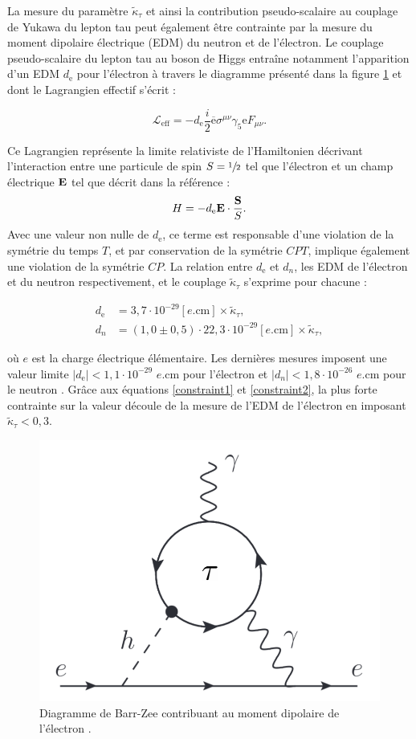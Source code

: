 La mesure du paramètre $\tilde{\kappa}_{\tau}$ et ainsi la contribution pseudo-scalaire au couplage de Yukawa du lepton tau peut également être contrainte par la mesure du moment dipolaire électrique (EDM) du neutron et de l'électron. Le couplage pseudo-scalaire du lepton tau au boson de Higgs entraîne notamment l'apparition d'un EDM $d_\mathrm{e}$ pour l'électron à travers le diagramme présenté dans la figure \ref{barrzee} et dont le Lagrangien effectif s'écrit :

\begin{equation}
    \mathcal{L}_{\text{eff}}=-d_\mathrm{e}\frac{i}{2}\overline{\mathrm{e}}\sigma^{\mu\nu}\gamma_5\mathrm{e}F_{\mu\nu}.
\end{equation}

Ce Lagrangien représente la limite relativiste de l'Hamiltonien décrivant l'interaction entre une particule de spin $S=\sfrac{1}{2}$ tel que l'électron et un champ électrique $\vb{E}$ tel que décrit dans la référence \cite{Pospelov_2005} : $$H=-d_\mathrm{e}\vb{E}\cdot\frac{\vb{S}}{S}.$$ Avec une valeur non nulle de $d_\mathrm{e}$, ce terme est responsable d'une violation de la symétrie du temps $T$, et par conservation de la symétrie $CPT$, implique également une violation de la symétrie $CP$. La relation entre $d_\mathrm{e}$ et $d_n$, les EDM de l'électron et du neutron respectivement, et le couplage $\tilde{\kappa}_{\tau}$ s'exprime pour chacune :

\begin{align}
    d_\mathrm{e}&=3,7\cdot10^{-29}[e.\text{cm}]\times\tilde{\kappa}_{\tau},
    \label{constraint1} \\
    d_n&=(1,0\pm0,5)\cdot22,3\cdot10^{-29}[e.\text{cm}]\times\tilde{\kappa}_{\tau},
    \label{constraint2}
\end{align}

où $e$ est la charge électrique élémentaire. Les dernières mesures imposent une valeur limite $|d_\mathrm{e}|<1,1\cdot10^{-29}$ $e.\text{cm}$ pour l'électron \cite{eEDM} et $|d_n|<1,8\cdot10^{-26}$ $e.\text{cm}$ pour le neutron \cite{nEDM}. Grâce aux équations \ref{constraint1} et \ref{constraint2}, la plus forte contrainte sur la valeur découle de la mesure de l'EDM de l'électron en imposant $\tilde{\kappa}_{\tau}<0,3$.

\begin{figure}
\centering
    \includegraphics[scale=0.25]{Chapitre5/Images/barrzee.png} 
    \caption{Diagramme de Barr-Zee contribuant au moment dipolaire de l'électron \cite{barrzee}.}
    \label{barrzee}
\end{figure}
